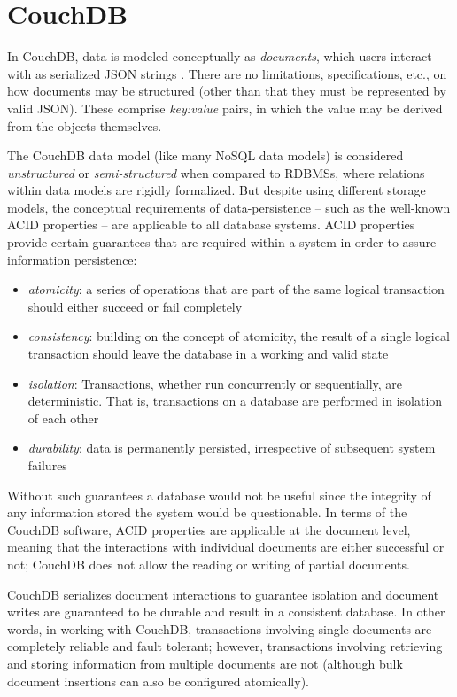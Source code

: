 \section{CouchDB}
In CouchDB, data is modeled conceptually as \textit{documents}, which users interact with as serialized JSON strings \cite{rfc7159}. There are no limitations, specifications, etc., on how documents may be structured (other than that they must be represented by valid JSON). These comprise \textit{key:value} pairs, in which the value may be derived from the objects themselves.

The CouchDB data model (like many NoSQL data models) is considered \textit{unstructured} or \textit{semi-structured} when compared to RDBMSs, where relations within data models are rigidly formalized. But despite using different storage models, the conceptual requirements of data-persistence – such as the well-known ACID properties – are applicable to all database systems. ACID properties provide certain guarantees that are required within a system in order to assure information persistence:

\begin{itemize}
    \item \textit{atomicity}: a series of operations that are part of the same logical transaction should either succeed or fail completely
    \item \textit{consistency}: building on the concept of atomicity, the result of a single logical transaction should leave the database in a working and valid state
    \item \textit{isolation}: Transactions, whether run concurrently or sequentially, are deterministic. That is, transactions on a database are performed in isolation of each other
    \item \textit{durability}: data is permanently persisted, irrespective of subsequent system failures
\end{itemize}

Without such guarantees a database would not be useful since the integrity of any information stored the system would be questionable. In terms of the CouchDB software, ACID properties are applicable at the document level, meaning that the interactions with individual documents are either successful or not; CouchDB does not allow the reading or writing of partial documents.

CouchDB serializes document interactions to guarantee isolation and document writes are guaranteed to be durable and result in a consistent database. In other words, in working with CouchDB, transactions involving single documents are completely reliable and fault tolerant; however, transactions involving retrieving and storing information from multiple documents are not (although bulk document insertions can also be configured atomically).

